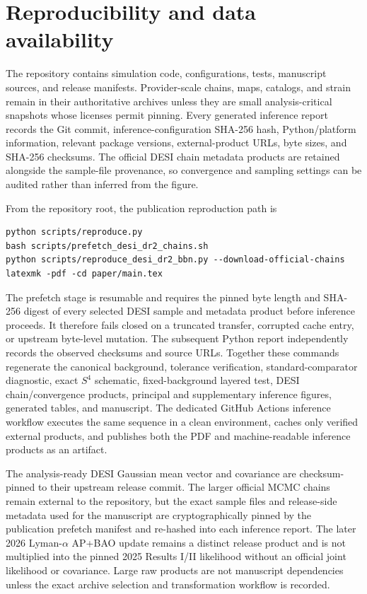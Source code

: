 \section{Reproducibility and data availability}
\label{app:reproducibility}

The repository contains simulation code, configurations, tests, manuscript sources, and release manifests. Provider-scale chains, maps, catalogs, and strain remain in their authoritative archives unless they are small analysis-critical snapshots whose licenses permit pinning. Every generated inference report records the Git commit, inference-configuration SHA-256 hash, Python/platform information, relevant package versions, external-product URLs, byte sizes, and SHA-256 checksums. The official DESI chain metadata products are retained alongside the sample-file provenance, so convergence and sampling settings can be audited rather than inferred from the figure.

From the repository root, the publication reproduction path is
\begin{verbatim}
python scripts/reproduce.py
bash scripts/prefetch_desi_dr2_chains.sh
python scripts/reproduce_desi_dr2_bbn.py --download-official-chains
latexmk -pdf -cd paper/main.tex
\end{verbatim}
The prefetch stage is resumable and requires the pinned byte length and SHA-256 digest of every selected DESI sample and metadata product before inference proceeds. It therefore fails closed on a truncated transfer, corrupted cache entry, or upstream byte-level mutation. The subsequent Python report independently records the observed checksums and source URLs. Together these commands regenerate the canonical background, tolerance verification, standard-comparator diagnostic, exact $S^4$ schematic, fixed-background layered test, DESI chain/convergence products, principal and supplementary inference figures, generated tables, and manuscript. The dedicated GitHub Actions inference workflow executes the same sequence in a clean environment, caches only verified external products, and publishes both the PDF and machine-readable inference products as an artifact.

The analysis-ready DESI Gaussian mean vector and covariance are checksum-pinned to their upstream release commit. The larger official MCMC chains remain external to the repository, but the exact sample files and release-side metadata used for the manuscript are cryptographically pinned by the publication prefetch manifest and re-hashed into each inference report. The later 2026 Lyman-$\alpha$ AP+BAO update remains a distinct release product and is not multiplied into the pinned 2025 Results I/II likelihood without an official joint likelihood or covariance. Large raw products are not manuscript dependencies unless the exact archive selection and transformation workflow is recorded.
